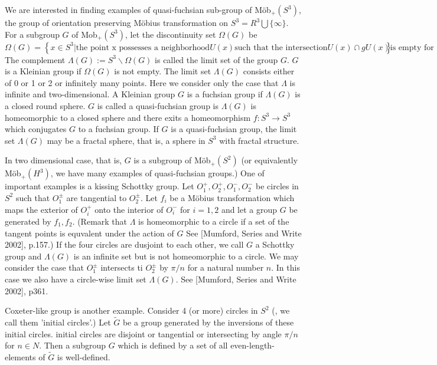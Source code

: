 \documentclass[dvipdfmx]{interact}
\theoremstyle{plain}%
\theoremstyle{definition}
\theoremstyle{remark}
\theoremstyle{problemstyle}
\begin{document}
We are interested in finding examples of quasi-fuchsian sub-group of
M\"ob$_{+}(S^3)$, the  group of orientation preserving M\"obius
transformation on $S^3 = R^3 \bigcup \{\infty\}$. For a subgroup $G$ of
Mob$_+(S^3)$, let the discontinuity set $\Omega(G)$ be
$$
\Omega(G) = \left\{ x \in S^3 \left| \text{the point x possesses a neighborhood} U(x)
\text{such that the intersection} U(x) \cap gU(x) \text{is empty for all but finite
elements} g\in G \right. \right\}.
$$
The complement $\Lambda(G) := S^3 \backslash \Omega(G)$ is called the
limit set of the group $G$. $G$ is a Kleinian group if $\Omega(G)$ is
not empty. The limit set $\Lambda(G)$ consists either of 0 or 1 or 2 or
infinitely many points. Here we consider only the case that $\Lambda$
is infinite and two-dimensional. A Kleinian group $G$ is a fuchsian
group if $\Lambda(G)$ is a closed round sphere. $G$ is called a
quasi-fuchsian group is $\Lambda(G)$ is homeomorphic to a closed sphere
and there exits a homeomorphism $f:S^3 \rightarrow S^3$ which conjugates
$G$ to a fuchsian group. If $G$ is a quasi-fuchsian group, the limit set
$\Lambda(G)$ may be a fractal sphere, that is, a sphere in $S^3$ with
fractal structure.

In two dimensional case, that is, $G$ is a subgroup of M\"ob$_+(S^2)$
(or equivalently M\"ob$_+(H^3)$, we have many examples of quasi-fuchsian
groups.) One of important examples is a kissing Schottky group.
Let $O_1^+, O_2^+, O_1^-, O_2^-$ be circles in $S^2$ such that
$O_1^{\pm}$ are tangential to $O_2^{\pm}$. Let $f_i$ be a M\"obius
transformation which maps the exterior of $O_i^+$ onto the interior of
$O_i^{-}$ for $i = 1, 2$ and let a group $G$ be generated by $f_1, f_2$.
(Remark that $\Lambda$ is homeomorphic to a circle if a set of the
tangent points is equvalent under the action of $G$ See [Mumford,
Series and Write 2002], p.157.) If the four circles are dusjoint to each
other, we call $G$ a Schottky group and $\Lambda(G)$ is an infinite set
but is not homeomorphic to a circle. We may consider the case that
$O_1^{\pm}$ intersects ti $O_2^{\pm}$ by $\pi/n$ for a natural number
$n$. In this case we also have a circle-wise limit set $\Lambda(G)$.
See [Mumford, Series and Write 2002], p361.

Coxeter-like group is another example. Consider 4 (or more) circles in
$S^2$ (, we call them 'initial circles'.) Let $\tilde G$ be a group generated
by the inversions of these initial circles.%
initial circles are disjoint or tangential or intersecting  by angle
$\pi/n$ for $n \in N$. Then a subgroup $G$ which is defined by a set of
all even-length-elements of $\tilde G$ is well-defined.
\end{document}
